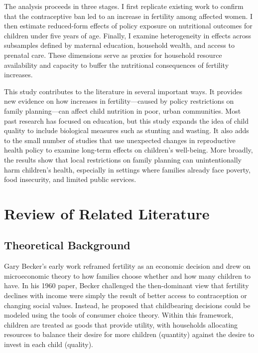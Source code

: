 \documentclass[]{AEA}
\begin{document}
The analysis proceeds in three stages. I first replicate existing work
\citep{dumas2019sex} to confirm that the contraceptive ban led to an
increase in fertility among affected women. I then estimate reduced-form
effects of policy exposure on nutritional outcomes for children under
five years of age. Finally, I examine heterogeneity in effects across
subsamples defined by maternal education, household wealth, and access
to prenatal care. These dimensions serve as proxies for household
resource availability and capacity to buffer the nutritional
consequences of fertility increases.

This study contributes to the literature in several important ways. It
provides new evidence on how increases in fertility---caused by policy
restrictions on family planning---can affect child nutrition in poor,
urban communities. Most past research has focused on education, but this
study expands the idea of child quality to include biological measures
such as stunting and wasting. It also adds to the small number of
studies that use unexpected changes in reproductive health policy to
examine long-term effects on children's well-being. More broadly, the
results show that local restrictions on family planning can
unintentionally harm children's health, especially in settings where
families already face poverty, food insecurity, and limited public
services.

\section{Review of Related Literature}

\subsection{Theoretical Background}

Gary Becker's early work reframed fertility as an economic decision and
drew on microeconomic theory to how families choose whether and how many
children to have. In his 1960 paper, Becker challenged the then-dominant
view that fertility declines with income were simply the result of
better access to contraception or changing social values. Instead, he
proposed that childbearing decisions could be modeled using the tools of
consumer choice theory. Within this framework, children are treated as
goods that provide utility, with households allocating resources to
balance their desire for more children (quantity) against the desire to
invest in each child (quality).
\end{document}
